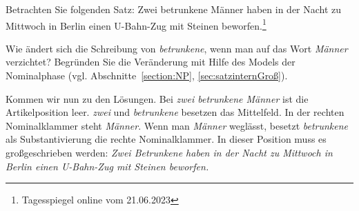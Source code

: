 Betrachten Sie folgenden Satz: 
\ea
Zwei betrunkene Männer haben in der Nacht zu Mittwoch in Berlin einen U-Bahn-Zug mit Steinen beworfen.\footnote{Tagesspiegel online vom 21.06.2023}
\z

Wie ändert sich die Schreibung von \textit{betrunkene}, wenn man auf das Wort \textit{Männer} verzichtet? Begründen Sie die Veränderung mit Hilfe des Models der Nominalphase (vgl. Abschnitte~\ref{section:NP}, \ref{sec:satzinternGroß}).

Kommen wir nun zu den Lösungen. Bei \textit{zwei betrunkene Männer} ist die Artikelposition leer. \textit{zwei} und \textit{betrunkene} besetzen das Mittelfeld. In der rechten Nominalklammer steht \textit{Männer}. Wenn man \textit{Männer} weglässt, besetzt \textit{betrunkene} als Substantivierung die rechte Nominalklammer. In dieser Position muss es großgeschrieben werden: \textit{Zwei Betrunkene haben in der Nacht zu Mittwoch in Berlin einen U-Bahn-Zug mit Steinen beworfen.}
